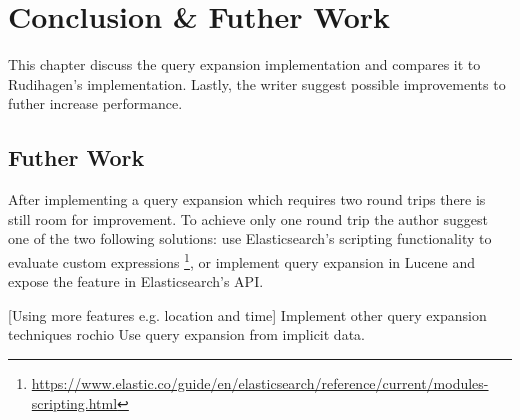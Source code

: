 \chapter{Conclusion \& Futher Work}
\label{ch:conclusion}
This chapter discuss the query expansion implementation and compares it to Rudihagen's implementation.
Lastly, the writer suggest possible improvements to futher increase performance.

\section{Futher Work}
After implementing a query expansion which requires two round trips there is still room for improvement.
To achieve only one round trip the author suggest one of the two following solutions:
use Elasticsearch's scripting functionality to evaluate custom expressions \footnote{\url{https://www.elastic.co/guide/en/elasticsearch/reference/current/modules-scripting.html}},
or implement query expansion in Lucene and expose the feature in Elasticsearch's API.

[Using more features e.g. location and time]
Implement other query expansion techniques rochio
Use query expansion from implicit data.
